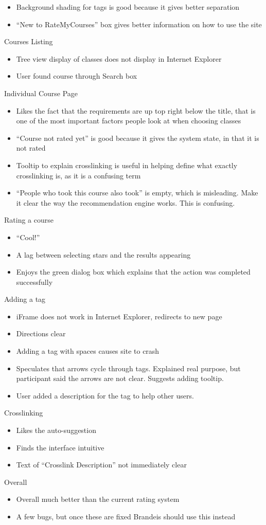 \documentclass[12pt]{report}
\begin{document}
\begin{itemize}
\item Background shading for tags is good because it gives better separation
\item ``New to RateMyCourses'' box gives better information on how to use the site
\end{itemize}
Courses Listing
\begin{itemize}
\item Tree view display of classes does not display in Internet Explorer
\item User found course through Search box
\end{itemize}
Individual Course Page
\begin{itemize}
\item Likes the fact that the requirements are up top right below the title, that is one of the most important factors people look at when choosing classes
\item ``Course not rated yet'' is good because it gives the system state, in that it is not rated
\item Tooltip to explain crosslinking is useful in helping define what exactly crosslinking is, as it is a confusing term
\item ``People who took this course also took'' is empty, which is misleading. Make it clear the way the recommendation engine works. This is confusing.
\end{itemize}
Rating a course
\begin{itemize}
\item ``Cool!''
\item A lag between selecting stars and the results appearing
\item Enjoys the green dialog box which explains that the action was completed successfully
\end{itemize}
Adding a tag
\begin{itemize}
\item iFrame does not work in Internet Explorer, redirects to new page
\item Directions clear
\item Adding a tag with spaces causes site to crash
\item Speculates that arrows cycle through tags. Explained real purpose, but participant said the arrows are not clear. Suggests adding tooltip.
\item User added a description for the tag to help other users.
\end{itemize}
Crosslinking
\begin{itemize}
\item Likes the auto-suggestion
\item Finds the interface intuitive
\item Text of ``Crosslink Description'' not immediately clear
\end{itemize}
Overall
\begin{itemize}
\item Overall much better than the current rating system
\item A few bugs, but once these are fixed Brandeis should use this instead
\end{itemize}
\end{document}
